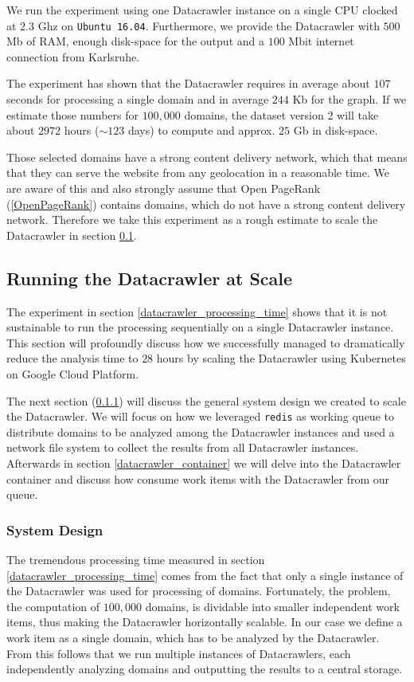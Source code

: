 We run the experiment using one Datacrawler instance on a single CPU clocked at $2.3$ Ghz on \texttt{Ubuntu 16.04}. Furthermore, we provide the Datacrawler with $500$ Mb of RAM, enough disk-space for the output and a $100$ Mbit internet connection from Karlsruhe.

The experiment has shown that the Datacrawler requires in average about $107$ seconds for processing a single domain and in average $244$ Kb for the graph. If we estimate those numbers for $100,000$ domains, the dataset version 2 will take about $2972$ hours ($\sim 123$ days) to compute and approx. $25$ Gb in disk-space.

Those selected domains have a strong content delivery network, which that means that they can serve the website from any geolocation in a reasonable time. We are aware of this and also strongly assume that Open PageRank (\ref{OpenPageRank}) contains domains, which do not have a strong content delivery network. Therefore we take this experiment as a rough estimate to scale the Datacrawler in section \ref{datacrawler_scale}.

\subsection{Running the Datacrawler at Scale}
\label{datacrawler_scale}
The experiment in section \ref{datacrawler_processing_time} shows that it is not sustainable to run the processing sequentially on a single Datacrawler instance. This section will profoundly discuss how we successfully managed to dramatically reduce the analysis time to $28$ hours by scaling the Datacrawler using Kubernetes on Google Cloud Platform. 

The next section (\ref{datacrawler_scale_architecture}) will discuss the general system design we created to scale the Datacrawler. We will focus on how we leveraged \texttt{redis} as working queue to distribute domains to be analyzed among the Datacrawler instances and used a network file system to collect the results from all Datacrawler instances. Afterwards in section \ref{datacrawler_container} we will delve into the Datacrawler container and discuss how consume work items with the Datacrawler from our queue.

\subsubsection{System Design}
\label{datacrawler_scale_architecture}
The tremendous processing time measured in section \ref{datacrawler_processing_time} comes from the fact that only a single instance of the Datacrawler was used for processing of domains. Fortunately, the problem, the computation of $100,000$ domains, is dividable into smaller independent work items, thus making the Datacrawler horizontally scalable. In our case we define a work item as a single domain, which has to be analyzed by the Datacrawler. From this follows that we run multiple instances of Datacrawlers, each independently analyzing domains and outputting the results to a central storage.

